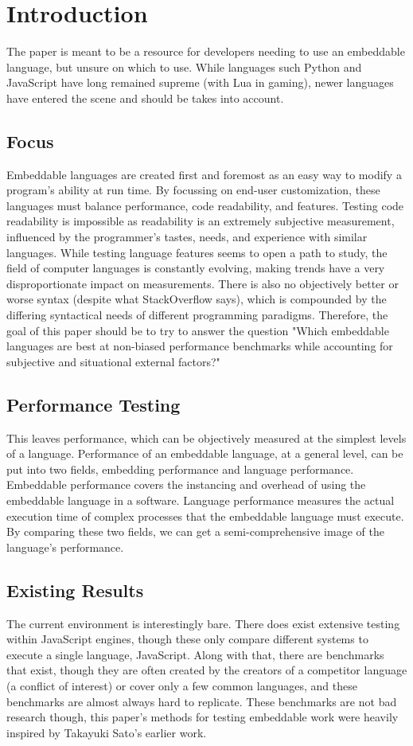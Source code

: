 \section{Introduction} \label{sec:introduction}
The paper is meant to be a resource for developers needing to use an embeddable language, but unsure on which to use. While languages such Python and JavaScript have long remained supreme (with Lua in gaming)\cite{trend:jslua}, newer languages have entered the scene and should be takes into account.

\subsection{Focus}
Embeddable languages are created first and foremost as an easy way to modify a program's ability at run time. By focussing on end-user customization, these languages must balance performance, code readability, and features. Testing code readability is impossible as readability is an extremely subjective measurement, influenced by the programmer's tastes, needs, and experience with similar languages. While testing language features seems to open a path to study, the field of computer languages is constantly evolving, making trends have a very disproportionate impact on measurements. There is also no objectively better or worse syntax (despite what StackOverflow says), which is compounded by the differing syntactical needs of different programming paradigms. Therefore, the goal of this paper should be to try to answer the question "Which embeddable languages are best at non-biased performance benchmarks while accounting for subjective and situational external factors?"

\subsection{Performance Testing}
This leaves performance, which can be objectively measured at the simplest levels of a language. Performance of an embeddable language, at a general level, can be put into two fields, embedding performance and language performance. Embeddable performance covers the instancing and overhead of using the embeddable language in a software. Language performance measures the actual execution time of complex processes that the embeddable language must execute. By comparing these two fields, we can get a semi-comprehensive image of the language's performance.

\subsection{Existing Results}
The current environment is interestingly bare. There does exist extensive testing within JavaScript engines, though these only compare different systems to execute a single language, JavaScript\cite{arewefastyet}. Along with that, there are benchmarks that exist, though they are often created by the creators of a competitor language (a conflict of interest) or cover only a few common languages, and these benchmarks are almost always hard to replicate. These benchmarks are not bad research though, this paper's methods for testing embeddable work were heavily inspired by Takayuki Sato's earlier work\cite{embench}.
